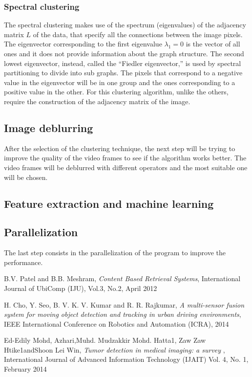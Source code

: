 \documentclass[11pt]{article}
\begin{document}
\subsubsection{Spectral clustering}
The spectral clustering makes use of the spectrum (eigenvalues) of the adjacency matrix $L$ of the data, that specify all the connections between the image pixels.
The eigenvector corresponding to the first eigenvalue $\lambda_1=0$ is the vector of all ones and it does not provide information about the graph structure. The second lowest eigenvector, instead, called the ``Fiedler eigenvector,'' is used by spectral partitioning to divide into sub graphs. The pixels that correspond to a negative value in the eigenvector will be in one group and the ones corresponding to a positive value in the other. 
For this clustering algorithm, unlike the others, require the construction of the adjacency matrix of the image.

\subsection{Image deblurring}
After the selection of the clustering technique, the next step will be trying to improve the quality of the video frames to see if the algorithm works better. The video frames will be deblurred with different operators and the most suitable one will be chosen.

\subsection{Feature extraction and machine learning}


\subsection{Parallelization}
The last step consists in the parallelization of the program to improve the performance. 

\begin{thebibliography}{9}
	
	B.V. Patel and B.B. Meshram,
	\textit{Content Based Retrieval Systems},
	International Journal of UbiComp (IJU), Vol.3, No.2, 
	April 2012
	
	H. Cho, Y. Seo, B. V. K. V. Kumar and R. R. Rajkumar, 
	\textit{A multi-sensor fusion system for moving object detection and tracking in urban driving environments}, 
	IEEE International Conference on Robotics and Automation (ICRA), 
	2014

	Ed-Edily Mohd,  Azhari,Muhd. Mudzakkir Mohd. Hatta1, Zaw Zaw Htike1andShoon Lei Win, 
	\textit{Tumor detection in medical imaging: a survey }, 
	International Journal of Advanced Information Technology (IJAIT) Vol. 4, No. 1, 
	February 2014
	
	
	
\end{thebibliography}
\end{document}
